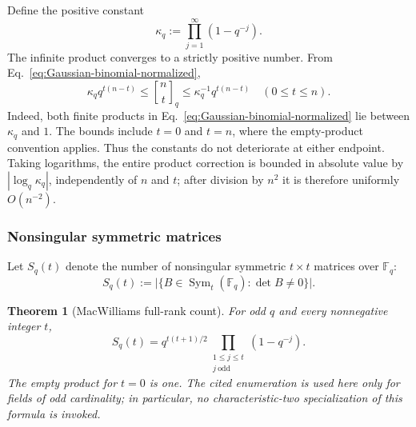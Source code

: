 \documentclass[11pt]{article}
\newcommand{\F}{\mathbb F}
\newcommand{\Sym}{\operatorname{Sym}}
\newcommand{\1}{\mathbf 1}
\theoremstyle{plain}
\newtheorem{theorem}{Theorem}[section]
\theoremstyle{definition}
\theoremstyle{remark}
\begin{document}
Define the positive constant
\begin{equation}
  \kappa_q
  :=\prod_{j=1}^{\infty}(1-q^{-j}).
  \label{eq:kappa-q-definition}
\end{equation}
The infinite product converges to a strictly positive number.  From
Eq.~\eqref{eq:Gaussian-binomial-normalized},
\begin{equation}
  \kappa_q q^{t(n-t)}
  \le \genfrac{[}{]}{0pt}{}{n}{t}_q
  \le \kappa_q^{-1}q^{t(n-t)}
  \quad(0\le t\le n).
  \label{eq:Gaussian-binomial-uniform-bounds}
\end{equation}
Indeed, both finite products in
Eq.~\eqref{eq:Gaussian-binomial-normalized} lie between $\kappa_q$ and $1$.
The bounds include $t=0$ and $t=n$, where the empty-product
convention applies.  Thus the constants do not deteriorate at either endpoint.
Taking logarithms, the entire product correction is bounded in absolute value
by $|\log_q\kappa_q|$, independently of $n$ and $t$; after division by $n^2$
it is therefore uniformly $O(n^{-2})$.

\subsubsection{Nonsingular symmetric matrices}
\label{appsubsec:nonsingular-symmetric-count}

Let $S_q(t)$ denote the number of nonsingular symmetric $t\times t$
matrices over $\F_q$:
\begin{equation}
  S_q(t)
  :=\lvert\{B\in\Sym_t(\F_q):\det B\ne0\}\rvert.
  \label{eq:nonsingular-symmetric-count-definition}
\end{equation}

\begin{theorem}[MacWilliams full-rank count]
\label{thm:MacWilliams-full-rank-count}
For odd $q$ and every nonnegative integer $t$,
\begin{equation}
  S_q(t)
  =q^{t(t+1)/2}
   \prod_{\substack{1\le j\le t\\ j\ \mathrm{odd}}}
   (1-q^{-j}).
  \label{eq:MacWilliams-full-rank-count}
\end{equation}
The empty product for $t=0$ is one.  The cited enumeration is used here only for fields of odd cardinality; in particular, no characteristic-two specialization of this formula is invoked.
\end{theorem}
\end{document}
